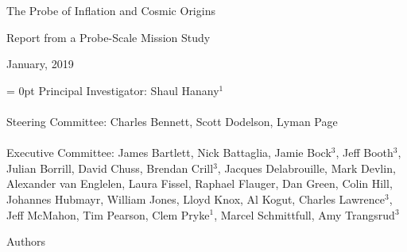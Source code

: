\documentclass[PICOReport.tex]{subfiles}
\begin{document}

\LARGE{ \centerline{The Probe of Inflation and Cosmic Origins}}
\vspace{0.1in}
\Large{ \centerline{Report from a Probe-Scale Mission Study}}
\Large{ \centerline{January, 2019 }}

\parindent = 0pt
\normalsize{Principal Investigator: Shaul Hanany$^1$ }\\
\vspace{-7pt} \\
\normalsize{Steering Committee: Charles Bennett, Scott Dodelson, Lyman Page } \\
\vspace{-7pt} \\
\normalsize{Executive Committee: 
James Bartlett,
Nick Battaglia,
Jamie Bock$^3$, 
Jeff Booth$^3$,
Julian Borrill, 
David Chuss,
Brendan Crill$^3$, 
Jacques Delabrouille,
Mark Devlin, 
Alexander van Englelen,
Laura Fissel,
Raphael Flauger, 
Dan Green,
Colin Hill,
Johannes Hubmayr,
William Jones, 
Lloyd Knox, 
Al Kogut, 
Charles Lawrence$^3$, \\
Jeff McMahon, 
Tim Pearson,
Clem Pryke$^1$, 
Marcel Schmittfull,
Amy Trangsrud$^3$ 
}
\\


\label{authorlist}

\Large  {\centerline {Authors}}
\end{document}
